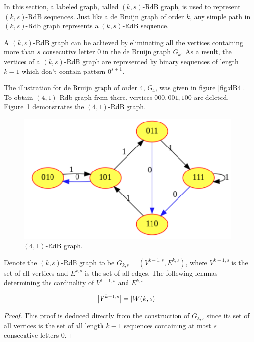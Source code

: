  In this section, a labeled graph, called $(k,s)$-RdB graph, is used to represent $(k,s)$-RdB sequences. Just like a de Bruijn graph of order $k$, any simple path in $(k,s)$-Rdb graph represents a $(k,s)$-RdB sequence.

A $(k,s)$-RdB graph can be achieved by eliminating all the vertices containing more than $s$ consecutive letter $0$ in the de Bruijn graph $G_{k}$. As a result, the vertices of a $(k,s)$-RdB graph are represented by binary sequences of length $k-1$ which don't contain pattern $0^{s+1}$.

The illustration for de Bruijn graph of order $4$, $G_{4}$, was given in figure \ref{fig:dB4}. To obtain $(4,1)$-Rdb graph from there, vertices $000,001,100$ are deleted. Figure~\ref{fig:RdB_4_1} demonstrates the $(4,1)$-RdB graph.

\begin{figure}[htbp]
    \centering
    \includegraphics[scale=0.25]{fig/RdB41.png}
    \caption{$(4,1)$-RdB graph.}
    \label{fig:RdB_4_1}
\end{figure}

Denote the $(k,s)$-RdB graph to be $G_{k,s} = (V^{k-1,s},E^{k,s})$, where $V^{k-1,s}$ is the set of all vertices and $E^{k,s}$ is the set of all edges. The following lemmas determining the cardinality of $V^{k-1,s}$ and $E^{k,s}$

\begin{lemma}\label{lem:num_V}
    \begin{align}
        \left \lvert  V^{k-1,s} \right \rvert = \left \lvert  W(k,s) \right \rvert\label{eq:num_V}
    \end{align}
\end{lemma}
\begin{proof}
    This proof is deduced directly from the construction of $G_{k,s}$ since its set of all vertices is the set of all length $k-1$ sequences containing at most $s$ consecutive letters $0$. 
\end{proof}

